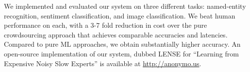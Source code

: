 We implemented and evaluated our system on three different tasks: named-entity
recognition, sentiment classification, and image classification.
We beat human performance on each, 
with a 3-7 fold reduction in cost over the pure crowdsourcing approach 
that achieves comparable accuracies and latencies.
Compared to pure ML approaches, we obtain substantially higher accuracy.
An open-source implementation of our system, dubbed LENSE for ``Learning from Expensive Noisy Slow Experts'' is available at
\href{http://anonymo.us}{http://anonymo.us}.

%
%

